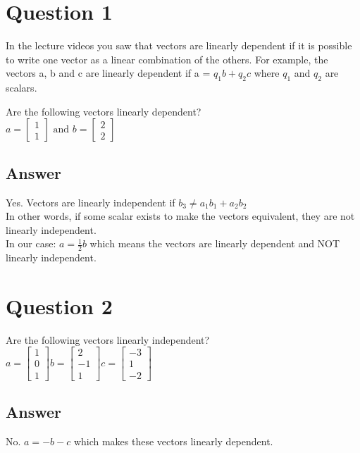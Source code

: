 \documentclass[12pt]{article}
\begin{document}
    \section*{Question 1}
    \begin{flushleft}
        In the lecture videos you saw that vectors are linearly dependent if it is possible
        to write one vector as a linear combination of the others. For example, the vectors
        a, b and c are linearly dependent if a =  $q_1b + q_2c$ where $q_1$ and $q_2$ are scalars. \\
    \end{flushleft}
    \begin{flushleft}
        Are the following vectors linearly dependent? \\
        $
            a =
            \begin{bmatrix}
                1 \\ 1
            \end{bmatrix}
            \text{ and } b = 
            \begin{bmatrix}
                2 \\ 2
            \end{bmatrix}
        $
    \end{flushleft}
    \subsection*{Answer}
    \begin{flushleft}
        Yes. Vectors are linearly independent if
        $
            b_3 \neq a_1b_1 + a_2b_2
        $ \\
        In other words, if some scalar exists to make the vectors equivalent, they are not linearly independent. \\
        In our case:
        $
            a = \frac{1}{2}b
        $
         which means the vectors are linearly dependent and NOT linearly independent.
    \end{flushleft}
    \section*{Question 2}
    \begin{flushleft}
        Are the following vectors linearly independent? \\
        $
            a = 
            \begin{bmatrix}
                1 \\ 0 \\ 1
            \end{bmatrix}
            b = 
            \begin{bmatrix}
                2 \\ - 1 \\ 1
            \end{bmatrix}
            c = 
            \begin{bmatrix}
                -3 \\ 1 \\ -2
            \end{bmatrix}
        $
    \end{flushleft}
    \subsection*{Answer}
    \begin{flushleft}
        No. $ a = -b - c $ which makes these vectors linearly dependent.
    \end{flushleft}
\end{document}
